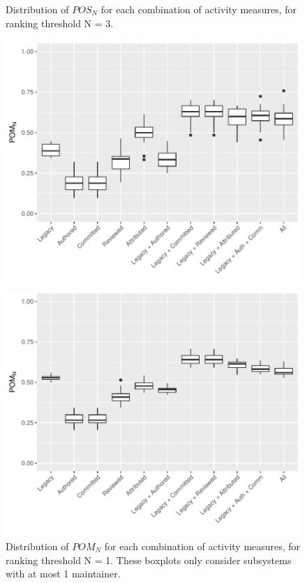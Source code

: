 \begin{figure}[t]
\begin{minipage}[b]{\columnwidth}
    \caption{Distribution of $POS_N$ for each combination of activity measures, for ranking threshold N = 3. }
    \label{fig:rq2_3}
  \end{minipage}
\end{figure}

\begin{figure}[t]
  \centering
  \begin{minipage}[b]{\columnwidth}
    \centering
    \includegraphics[scale=.55]{plots/RQ2_metrics_N1_many_maint}
    \caption{Distribution of $POM_N$ for each combination of activity measures, for ranking threshold N = 1. These boxplots only consider subsystems with at most 1 maintainer.}
    \label{fig:rq2_1_many}
  \end{minipage}
  \begin{minipage}[b]{\columnwidth}
    \centering
    \includegraphics[scale=.55]{plots/RQ2_metrics_N3_many_maint}

\end{minipage}
\end{figure}
